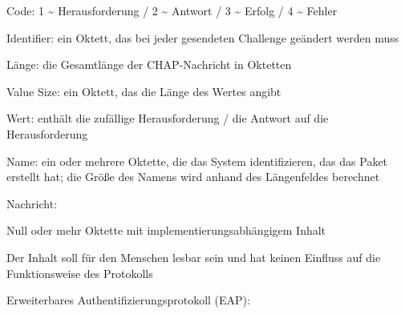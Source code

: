 \documentclass[a4paper]{article}
\begin{document}
\begin{multicols}{3}
\begin{itemize*}
            \begin{itemize*}
                  \item Code: 1 \textasciitilde{} Herausforderung / 2 \textasciitilde{} Antwort / 3 \textasciitilde{} Erfolg / 4 \textasciitilde{} Fehler
                  \item Identifier: ein Oktett, das bei jeder gesendeten Challenge geändert werden muss
                  \item Länge: die Gesamtlänge der CHAP-Nachricht in Oktetten
                  \item Value Size: ein Oktett, das die Länge des Wertes angibt
                  \item Wert: enthält die zufällige Herausforderung / die Antwort auf die Herausforderung
                  \item Name: ein oder mehrere Oktette, die das System identifizieren, das das Paket erstellt hat; die Größe des Namens wird anhand des Längenfeldes berechnet
                  \item Nachricht:
                  \begin{itemize*} \item Null oder mehr Oktette mit implementierungsabhängigem Inhalt \item Der Inhalt soll für den Menschen lesbar sein und hat keinen Einfluss auf die Funktionsweise des Protokolls \end{itemize*}
            \end{itemize*}
            \item
            Erweiterbares Authentifizierungsprotokoll (EAP):


\end{itemize*}
\end{multicols}
\end{document}
